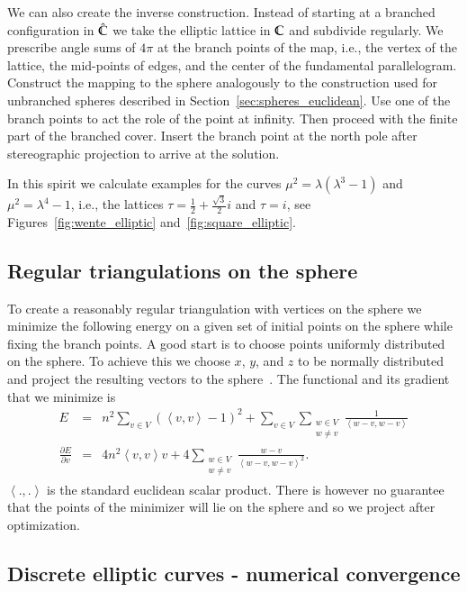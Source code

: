 \documentclass[Thesis]{subfiles}
\begin{document}
We can also create the inverse construction. 
Instead of starting at a branched configuration in $\hat {\mathbb C}$ we take the elliptic lattice in $\mathbb C$ and subdivide regularly.
We prescribe angle sums of $4\pi$ at the branch points of the map, i.e., the vertex of the lattice, the mid-points of edges, and the center of the fundamental parallelogram.
Construct the mapping to the sphere analogously to the construction used for unbranched spheres described in Section~\ref{sec:spheres_euclidean}.
Use one of the branch points to act the role of the point at infinity.
Then proceed with the finite part of the branched cover.
Insert the branch point at the north pole after stereographic projection to arrive at the solution.

In this spirit we calculate examples for the curves $\mu^2=\lambda(\lambda^3-1)$ and $\mu^2=\lambda^4-1$, i.e., the lattices $\tau=\frac{1}{2}+\frac{\sqrt 3}{2}i$ and $\tau=i$, see Figures~\ref{fig:wente_elliptic} and~\ref{fig:square_elliptic}.

\subsection{Regular triangulations on the sphere}
\label{sec:spherical_triangulations}

To create a reasonably regular triangulation with vertices on the sphere we minimize the following energy on a given set of initial points on the sphere while fixing the branch points. 
A good start is to choose points uniformly distributed on the sphere. 
To achieve this we choose $x$, $y$, and $z$ to be normally distributed and project the resulting vectors to the sphere~\cite{Muller1959}. 
The functional and its gradient that we minimize is
\begin{eqnarray*}
E &=& n^2\sum_{v\in V}\left( \left<v,v\right> - 1\right)^2 + \sum_{v\in V}\sum_{\substack{w\in V\\w\neq v}} \frac{1}{\left<w-v, w-v\right>}\\ 
\frac{\partial E}{\partial v} &=& 4n^2\left<v,v\right>v + 4\sum_{\substack{w\in V\\w\neq v}}\frac{w-v}{\left<w-v,w-v\right>^2}.
\end{eqnarray*}
$\left<.,.\right>$ is the standard euclidean scalar product. There is however no guarantee that the points of the minimizer will lie on the sphere and so we project after optimization.

\subsection{Discrete elliptic curves - numerical convergence}
\label{sec:numerical_convergence}
\end{document}
